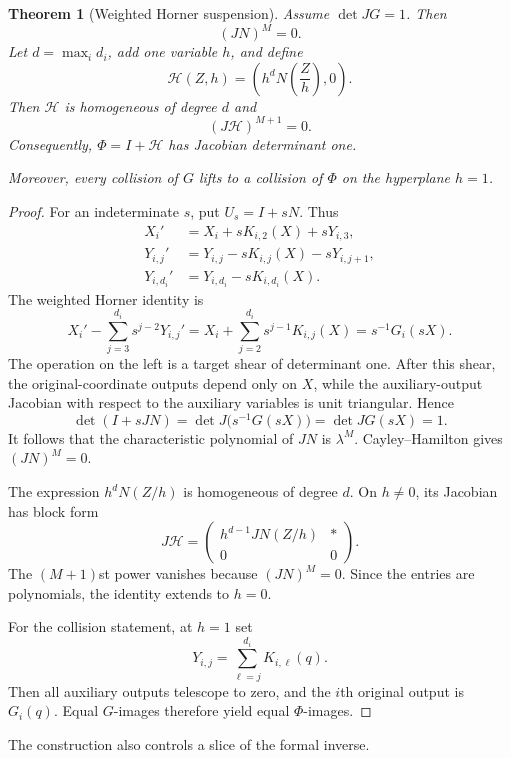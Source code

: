 \documentclass[11pt,reqno]{amsart}
\newtheorem{theorem}{Theorem}[section]
\begin{document}
\begin{theorem}[Weighted Horner suspension]\label{thm:horner}
Assume $\det JG=1$.  Then
\[
 (JN)^M=0.
\]
Let $d=\max_i d_i$, add one variable $h$, and define
\[
 \mathcal H(Z,h)=\left(h^dN\left(\frac Zh\right),0\right).
\]
Then $\mathcal H$ is homogeneous of degree $d$ and
\[
 (J\mathcal H)^{M+1}=0.
\]
Consequently, $\Phi=I+\mathcal H$ has Jacobian determinant one.

Moreover, every collision of $G$ lifts to a collision of $\Phi$ on the
hyperplane $h=1$.
\end{theorem}

\begin{proof}
For an indeterminate $s$, put $U_s=I+sN$.  Thus
\begin{align*}
 X_i'&=X_i+sK_{i,2}(X)+sY_{i,3},\\
 Y_{i,j}'&=Y_{i,j}-sK_{i,j}(X)-sY_{i,j+1},\\
 Y_{i,d_i}'&=Y_{i,d_i}-sK_{i,d_i}(X).
\end{align*}
The weighted Horner identity is
\begin{equation}\label{eq:telescoping}
 X_i'-\sum_{j=3}^{d_i}s^{j-2}Y_{i,j}'
 =X_i+\sum_{j=2}^{d_i}s^{j-1}K_{i,j}(X)
 =s^{-1}G_i(sX).
\end{equation}
The operation on the left is a target shear of determinant one.  After this
shear, the original-coordinate outputs depend only on $X$, while the
auxiliary-output Jacobian with respect to the auxiliary variables is unit
triangular.  Hence
\[
 \det(I+sJN)
 =\det J\bigl(s^{-1}G(sX)\bigr)
 =\det JG(sX)
 =1.
\]
It follows that the characteristic polynomial of $JN$ is $\lambda^M$.
Cayley--Hamilton gives $(JN)^M=0$.

The expression $h^dN(Z/h)$ is homogeneous of degree $d$.  On $h\neq0$,
its Jacobian has block form
\[
 J\mathcal H=
 \begin{pmatrix}
 h^{d-1}JN(Z/h)& *\\
 0&0
 \end{pmatrix}.
\]
The $(M+1)$st power vanishes because $(JN)^M=0$.  Since the entries are
polynomials, the identity extends to $h=0$.

For the collision statement, at $h=1$ set
\[
 Y_{i,j}=\sum_{\ell=j}^{d_i}K_{i,\ell}(q).
\]
Then all auxiliary outputs telescope to zero, and the $i$th original output
is $G_i(q)$.  Equal $G$-images therefore yield equal $\Phi$-images.
\end{proof}

The construction also controls a slice of the formal inverse.
\end{document}
